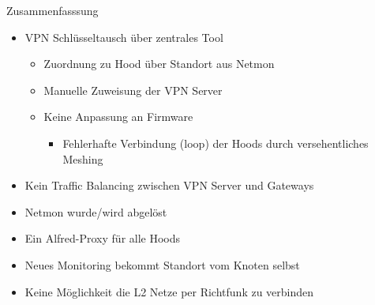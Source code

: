 \begin{frame}{Zusammenfasssung}
    \begin{itemize}
        \item VPN Schlüsseltausch über zentrales Tool
        \begin{itemize}
            \item Zuordnung zu Hood über Standort aus Netmon
            \item Manuelle Zuweisung der VPN Server
            \item Keine Anpassung an Firmware
            \begin{itemize}
                \item Fehlerhafte Verbindung (loop) der Hoods durch versehentliches Meshing
            \end{itemize}
        \end{itemize}
        \item Kein Traffic Balancing zwischen VPN Server und Gateways
        \item Netmon wurde/wird abgelöst
        \item Ein Alfred-Proxy für alle Hoods
        \item Neues Monitoring bekommt Standort vom Knoten selbst
        \item Keine Möglichkeit die L2 Netze per Richtfunk zu verbinden
    \end{itemize}
\end{frame}
